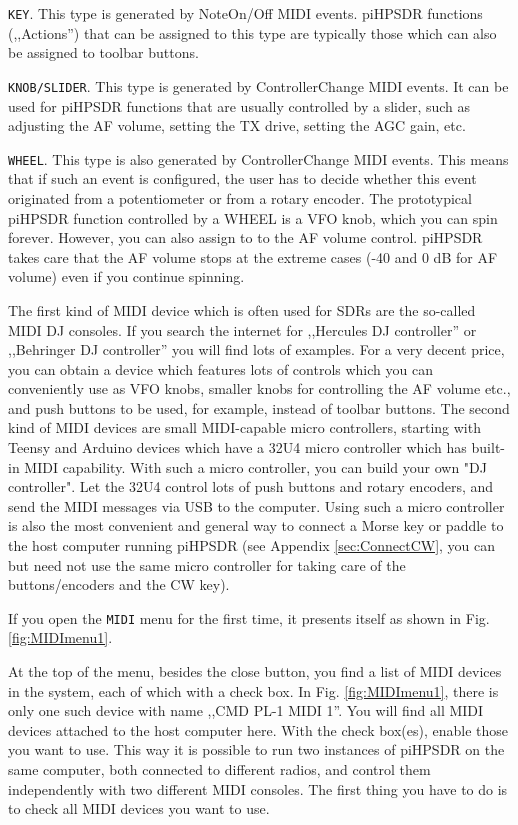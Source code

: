 \documentclass[12pt]{book}
\def\rett#1{\texttt{\color{red}#1}}
\def\bltt#1{\texttt{\color{blue}#1}}
\def\pH{pi\-HPSDR }
\begin{document}
\rett{KEY}. This type is generated by NoteOn/Off MIDI events. \pH functions (,,Actions'') that
can be assigned to this type are typically those which can also be assigned to toolbar
buttons.

\rett{KNOB/SLIDER}. This type is generated by ControllerChange MIDI events. It can be used
for \pH functions that are usually controlled by a slider, such as adjusting the AF
volume, setting the TX drive, setting the AGC gain, etc.

\rett{WHEEL}. This type is also generated by ControllerChange MIDI events. This means
that if such an event is configured, the user has to decide whether this event
originated from a potentiometer or from a rotary encoder. The prototypical \pH
function controlled by a WHEEL is a VFO knob, which you can spin forever. However,
you can also assign to to the AF volume control. \pH takes care that the
AF volume stops at the extreme cases (-40 and 0 dB for AF volume) even if you continue
spinning.

The first kind of MIDI device which is often used for SDRs are the so-called MIDI DJ
consoles. If you search the internet for ,,Hercules DJ controller'' or ,,Behringer
DJ controller'' you will find lots of examples. For a very decent price, you
can obtain a device which features lots of controls which you can conveniently use
as VFO knobs, smaller knobs for controlling the AF volume etc., and push buttons
to be used, for example, instead of toolbar buttons. The second kind of MIDI devices
are small MIDI-capable micro controllers, starting with Teensy and Arduino devices
which have a 32U4 micro controller which has built-in MIDI capability. With such a
micro controller, you can build your own "DJ controller". Let the 32U4 control
lots of push buttons and rotary encoders, and send the MIDI messages via USB to the
computer. Using such a micro controller is also the most convenient and general way
to connect a Morse key or paddle to the host computer running \pH (see
Appendix \ref{sec:ConnectCW}, you can but need not use the same micro controller
for taking care of the buttons/encoders and the CW key).

If you open the \bltt{MIDI} menu for the first time, it presents itself as shown
in Fig. \ref{fig:MIDImenu1}.



At the top of the menu, besides the close button, you find a list of MIDI devices
in the system, each of which with a check box. In Fig. \ref{fig:MIDImenu1}, there is only
one such device with name ,,CMD PL-1 MIDI 1''. You will find all MIDI devices attached
to the host computer here. With the check box(es), enable those you want to use.
This way it is possible to run two instances of \pH on the same computer, both
connected to different radios, and control them independently with two different MIDI
consoles. The first thing you have to do is to check all MIDI devices you want to use.
\end{document}
